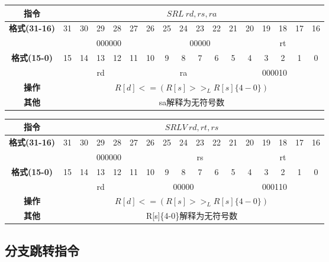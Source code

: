 \documentclass[11pt,utf8]{article}
\begin{document}
\begin{center}
\begin{tabular}{|c|c|c|c|c|c|c|c|c|c|c|c|c|c|c|c|c|}
\hline
\textbf{指令} & \multicolumn{16}{c|}{$SRL~rd, rs, ra$} \\
\hline
\multirow{2}{*}{\textbf{格式(31-16)}} & 31 & 30 & 29 & 28 & 27 & 26 & 25 & 24 & 23 & 22 & 21 & 20 & 19 & 18 & 17 & 16 \\ 
\cline{2-17}
& \multicolumn{6}{c|}{000000} & \multicolumn{5}{c|}{00000} & \multicolumn{5}{c|}{rt}\\
\hline
\multirow{2}{*}{\textbf{格式(15-0)}} & 15 & 14 & 13 & 12 & 11 & 10 & 9 & 8 & 7 & 6 & 5 & 4 & 3 & 2 & 1 & 0 \\
\cline{2-17}
& \multicolumn{5}{c|}{rd} & \multicolumn{5}{c|}{ra} & \multicolumn{6}{c|}{000010}\\
\hline
\textbf{操作} & \multicolumn{16}{c|}{$R[d]<=(R[s]>>_L R[s]\{4-0\})$} \\
\hline
\textbf{其他} & \multicolumn{16}{c|}{sa解释为无符号数} \\
\hline
\end{tabular}
\end{center}

\begin{center}
\begin{tabular}{|c|c|c|c|c|c|c|c|c|c|c|c|c|c|c|c|c|}
\hline
\textbf{指令} & \multicolumn{16}{c|}{$SRLV~rd, rt, rs$} \\
\hline
\multirow{2}{*}{\textbf{格式(31-16)}} & 31 & 30 & 29 & 28 & 27 & 26 & 25 & 24 & 23 & 22 & 21 & 20 & 19 & 18 & 17 & 16 \\ 
\cline{2-17}
& \multicolumn{6}{c|}{000000} & \multicolumn{5}{c|}{rs} & \multicolumn{5}{c|}{rt}\\
\hline
\multirow{2}{*}{\textbf{格式(15-0)}} & 15 & 14 & 13 & 12 & 11 & 10 & 9 & 8 & 7 & 6 & 5 & 4 & 3 & 2 & 1 & 0 \\
\cline{2-17}
& \multicolumn{5}{c|}{rd} & \multicolumn{5}{c|}{00000} & \multicolumn{6}{c|}{000110}\\
\hline
\textbf{操作} & \multicolumn{16}{c|}{$R[d]<=(R[s]>>_L R[s]\{4-0\})$} \\
\hline
\textbf{其他} & \multicolumn{16}{c|}{R[s]\{4-0\}解释为无符号数} \\
\hline
\end{tabular}
\end{center}

\subsection{分支跳转指令}
\end{document}
